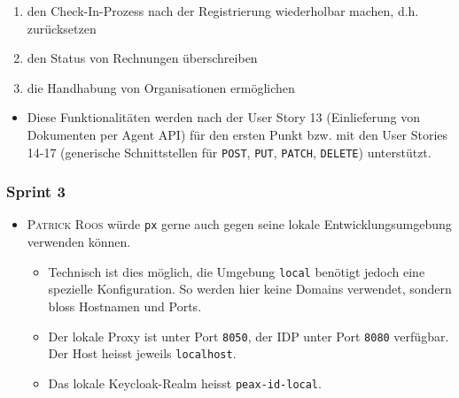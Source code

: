 \begin{itemize}
\begin{enumerate}
            \item den Check-In-Prozess nach der Registrierung wiederholbar machen, d.h. zurücksetzen
            \item den Status von Rechnungen überschreiben
            \item die Handhabung von Organisationen ermöglichen
        \end{enumerate}
        \begin{itemize}
            \item Diese Funktionalitäten werden nach der User Story 13 (Einlieferung von Dokumenten per Agent API) für den ersten Punkt bzw. mit den User Stories 14-17 (generische Schnittstellen für \texttt{POST}, \texttt{PUT}, \texttt{PATCH}, \texttt{DELETE}) unterstützt.
        \end{itemize}
\end{itemize}

\subsubsection{Sprint 3}

\begin{itemize}
    \item \textsc{Patrick Roos} würde \texttt{px} gerne auch gegen seine lokale Entwicklungsumgebung verwenden können.
        \begin{itemize}
            \item Technisch ist dies möglich, die Umgebung \texttt{local} benötigt jedoch eine spezielle Konfiguration. So werden hier keine Domains verwendet, sondern bloss Hostnamen und Ports.
            \item Der lokale Proxy ist unter Port \texttt{8050}, der IDP unter Port \texttt{8080} verfügbar. Der Host heisst jeweils \texttt{localhost}.
            \item Das lokale Keycloak-Realm heisst \texttt{peax-id-local}.
        \end{itemize}
\end{itemize}
